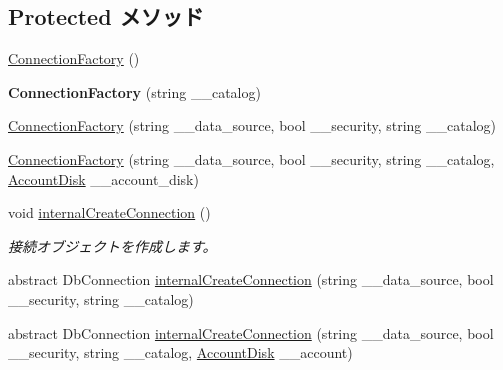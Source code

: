 \subsection*{Protected メソッド}
\begin{DoxyCompactItemize}
\item 
\hyperlink{classlazurite_1_1etherial_1_1utils_1_1_connection_factory_a8dc6cf76218ceca7dbae7bc96d89c501}{ConnectionFactory} ()
\item 
\hypertarget{classlazurite_1_1etherial_1_1utils_1_1_connection_factory_af09af07a18ec804d81e5a1ebac0075ec}{
{\bfseries ConnectionFactory} (string \_\-\_\-catalog)}
\label{classlazurite_1_1etherial_1_1utils_1_1_connection_factory_af09af07a18ec804d81e5a1ebac0075ec}

\item 
\hyperlink{classlazurite_1_1etherial_1_1utils_1_1_connection_factory_a24dadfe9941a6c595a102624fc7a5d92}{ConnectionFactory} (string \_\-\_\-data\_\-source, bool \_\-\_\-security, string \_\-\_\-catalog)
\item 
\hyperlink{classlazurite_1_1etherial_1_1utils_1_1_connection_factory_ac0e33b29a244b4c8342c6934fe508a81}{ConnectionFactory} (string \_\-\_\-data\_\-source, bool \_\-\_\-security, string \_\-\_\-catalog, \hyperlink{classlazurite_1_1etherial_1_1utils_1_1_connection_factory_1_1_account_disk}{AccountDisk} \_\-\_\-account\_\-disk)
\item 
void \hyperlink{classlazurite_1_1etherial_1_1utils_1_1_connection_factory_a65f9c1c53f6a6897b30534a024b97150}{internalCreateConnection} ()
\begin{DoxyCompactList}\small\item\em 接続オブジェクトを作成します。 \item\end{DoxyCompactList}\item 
abstract DbConnection \hyperlink{classlazurite_1_1etherial_1_1utils_1_1_connection_factory_adc19f91b5686f5a21af75a180bab6db3}{internalCreateConnection} (string \_\-\_\-data\_\-source, bool \_\-\_\-security, string \_\-\_\-catalog)
\item 
abstract DbConnection \hyperlink{classlazurite_1_1etherial_1_1utils_1_1_connection_factory_a21c31b431a87b330f8a7030140059861}{internalCreateConnection} (string \_\-\_\-data\_\-source, bool \_\-\_\-security, string \_\-\_\-catalog, \hyperlink{classlazurite_1_1etherial_1_1utils_1_1_connection_factory_1_1_account_disk}{AccountDisk} \_\-\_\-account)
\end{DoxyCompactItemize}
